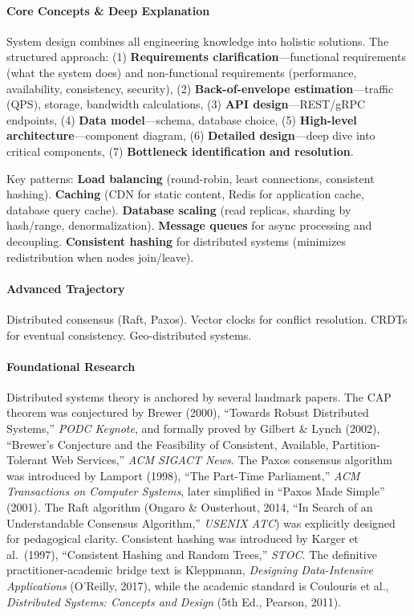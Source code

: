\documentclass[11pt, a4paper, oneside]{report}
\begin{document}
\paragraph{Core Concepts \& Deep Explanation} System design combines all engineering knowledge into holistic solutions. The structured approach: (1) \textbf{Requirements clarification}---functional requirements (what the system does) and non-functional requirements (performance, availability, consistency, security), (2) \textbf{Back-of-envelope estimation}---traffic (QPS), storage, bandwidth calculations, (3) \textbf{API design}---REST/gRPC endpoints, (4) \textbf{Data model}---schema, database choice, (5) \textbf{High-level architecture}---component diagram, (6) \textbf{Detailed design}---deep dive into critical components, (7) \textbf{Bottleneck identification and resolution}.

Key patterns: \textbf{Load balancing} (round-robin, least connections, consistent hashing). \textbf{Caching} (CDN for static content, Redis for application cache, database query cache). \textbf{Database scaling} (read replicas, sharding by hash/range, denormalization). \textbf{Message queues} for async processing and decoupling. \textbf{Consistent hashing} for distributed systems (minimizes redistribution when nodes join/leave).

\paragraph{Advanced Trajectory} Distributed consensus (Raft, Paxos). Vector clocks for conflict resolution. CRDTs for eventual consistency. Geo-distributed systems.


\paragraph{Foundational Research} Distributed systems theory is anchored by several landmark papers. The CAP theorem was conjectured by Brewer (2000), ``Towards Robust Distributed Systems,'' \emph{PODC Keynote}, and formally proved by Gilbert \& Lynch (2002), ``Brewer's Conjecture and the Feasibility of Consistent, Available, Partition-Tolerant Web Services,'' \emph{ACM SIGACT News}. The Paxos consensus algorithm was introduced by Lamport (1998), ``The Part-Time Parliament,'' \emph{ACM Transactions on Computer Systems}, later simplified in ``Paxos Made Simple'' (2001). The Raft algorithm (Ongaro \& Ousterhout, 2014, ``In Search of an Understandable Consensus Algorithm,'' \emph{USENIX ATC}) was explicitly designed for pedagogical clarity. Consistent hashing was introduced by Karger et al.\ (1997), ``Consistent Hashing and Random Trees,'' \emph{STOC}. The definitive practitioner-academic bridge text is Kleppmann, \emph{Designing Data-Intensive Applications} (O'Reilly, 2017), while the academic standard is Coulouris et al., \emph{Distributed Systems: Concepts and Design} (5th Ed., Pearson, 2011).
\end{document}
